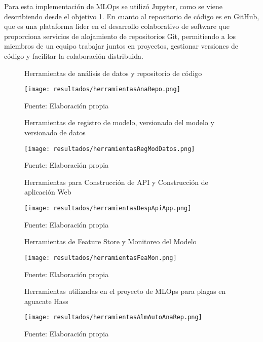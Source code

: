 Para esta implementación de MLOps se utilizó Jupyter, como se viene describiendo desde el objetivo 1. En cuanto al repositorio de código es en GitHub, que es una plataforma líder en el desarrollo colaborativo de software que proporciona servicios de alojamiento de repositorios Git, permitiendo a los miembros de un equipo trabajar juntos en proyectos, gestionar versiones de código y facilitar la colaboración distribuida.

\newpage

\begin{figure}[h]
\centering
\caption{Herramientas de análisis de datos y repositorio de código}
\texttt{[image: resultados/herramientasAnaRepo.png]}
\caption*{\footnotesize Fuente: Elaboración propia}
\label{fig:figuraHerramientasAnaRepo}
\end{figure}

\begin{figure}[h]
\centering
\caption{Herramientas de registro de modelo, versionado del modelo y versionado de datos}
\texttt{[image: resultados/herramientasRegModDatos.png]}
\caption*{\footnotesize Fuente: Elaboración propia}
\label{fig:figuraHerramientasRegModDatos}
\end{figure}

\newpage

\begin{figure}[h]
\centering
\caption{Herramientas para Construcción de API y Construcción de aplicación Web}
\texttt{[image: resultados/herramientasDespApiApp.png]}
\caption*{\footnotesize Fuente: Elaboración propia}
\label{fig:figuraHerramientasDespApiApp}
\end{figure}

\begin{figure}[h]
\centering
\caption{Herramientas de Feature Store y Monitoreo del Modelo}
\texttt{[image: resultados/herramientasFeaMon.png]}
\caption*{\footnotesize Fuente: Elaboración propia}
\label{fig:figuraHerramientasFeaMon}
\end{figure}

\newpage

\begin{figure}[h]
\centering
\caption{Herramientas utilizadas en el proyecto de MLOps para plagas en aguacate Hass}
\texttt{[image: resultados/herramientasAlmAutoAnaRep.png]}
\caption*{\footnotesize Fuente: Elaboración propia}
\label{fig:figuraHerramientasAlmAutoAnaRep}
\end{figure}

